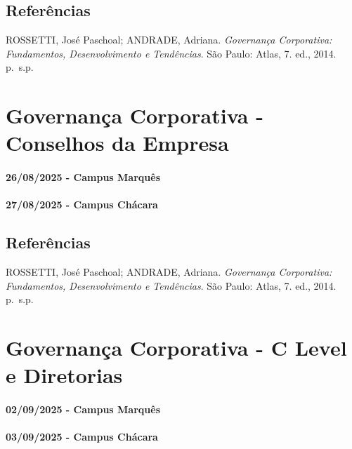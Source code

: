 \documentclass[
]{book}
\begin{document}
\section{Referências}\label{referuxeancias-1}

ROSSETTI, José Paschoal; ANDRADE, Adriana. \emph{Governança Corporativa: Fundamentos, Desenvolvimento e Tendências}. São Paulo: Atlas, 7. ed., 2014. p.~s.p.

\chapter{Governança Corporativa - Conselhos da Empresa}\label{governanuxe7a-corporativa---conselhos-da-empresa}

\subsubsection*{26/08/2025 - Campus Marquês}\label{campus-marquuxeas-3}

\subsubsection*{27/08/2025 - Campus Chácara}\label{campus-chuxe1cara-3}

\section{Referências}\label{referuxeancias-2}

ROSSETTI, José Paschoal; ANDRADE, Adriana. \emph{Governança Corporativa: Fundamentos, Desenvolvimento e Tendências}. São Paulo: Atlas, 7. ed., 2014. p.~s.p.

\chapter{Governança Corporativa - C Level e Diretorias}\label{governanuxe7a-corporativa---c-level-e-diretorias}

\subsubsection*{02/09/2025 - Campus Marquês}\label{campus-marquuxeas-4}

\subsubsection*{03/09/2025 - Campus Chácara}\label{campus-chuxe1cara-4}
\end{document}
